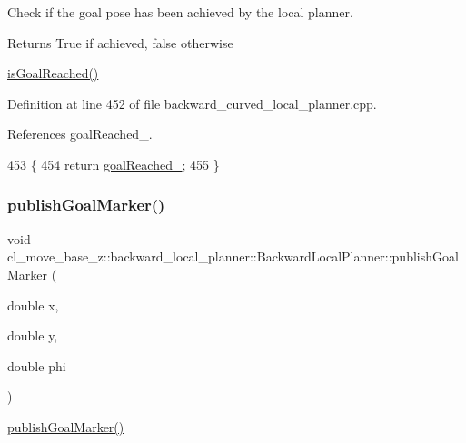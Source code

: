 Check if the goal pose has been achieved by the local planner. 

\begin{DoxyReturn}{Returns}
True if achieved, false otherwise
\end{DoxyReturn}
\hyperlink{classcl__move__base__z_1_1backward__local__planner_1_1BackwardLocalPlanner_a06a99e609ed31b97f765351dd6827722}{is\+Goal\+Reached()} 

Definition at line 452 of file backward\+\_\+curved\+\_\+local\+\_\+planner.\+cpp.



References goal\+Reached\+\_\+.


\begin{DoxyCode}
453         \{
454             \textcolor{keywordflow}{return} \hyperlink{classcl__move__base__z_1_1backward__local__planner_1_1BackwardLocalPlanner_ad443c52ef585a8eab0364f0909222f51}{goalReached\_};
455         \}
\end{DoxyCode}
\mbox{\label{classcl__move__base__z_1_1backward__local__planner_1_1BackwardLocalPlanner_a70eaeb6cf31fd3378d9fbf9bcb975995}} 
\subsubsection{\texorpdfstring{publish\+Goal\+Marker()}{publishGoalMarker()}}
{\footnotesize\ttfamily void cl\+\_\+move\+\_\+base\+\_\+z\+::backward\+\_\+local\+\_\+planner\+::\+Backward\+Local\+Planner\+::publish\+Goal\+Marker (\begin{DoxyParamCaption}\item[{double}]{x,  }\item[{double}]{y,  }\item[{double}]{phi }\end{DoxyParamCaption})\hspace{0.3cm}{\ttfamily [private]}}

\hyperlink{classcl__move__base__z_1_1backward__local__planner_1_1BackwardLocalPlanner_a70eaeb6cf31fd3378d9fbf9bcb975995}{publish\+Goal\+Marker()} 

